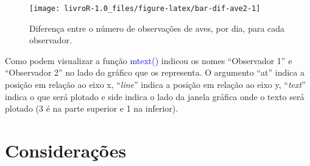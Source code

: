 \documentclass[14pt,titlepage, oneside, openany, a4paper]{book}
\newenvironment{Shaded}{\begin{snugshade}}{\end{snugshade}}
\newcommand{\DataTypeTok}[1]{\textcolor[rgb]{0.13,0.29,0.53}{#1}}
\newcommand{\DecValTok}[1]{\textcolor[rgb]{0.00,0.00,0.81}{#1}}
\newcommand{\FloatTok}[1]{\textcolor[rgb]{0.00,0.00,0.81}{#1}}
\newcommand{\KeywordTok}[1]{\textcolor[rgb]{0.13,0.29,0.53}{\textbf{#1}}}
\newcommand{\NormalTok}[1]{#1}
\newcommand{\OperatorTok}[1]{\textcolor[rgb]{0.81,0.36,0.00}{\textbf{#1}}}
\newcommand{\StringTok}[1]{\textcolor[rgb]{0.31,0.60,0.02}{#1}}
\begin{document}
\begin{Shaded}
\end{Shaded}

\begin{figure}[H]

{\centering \texttt{[image: livroR-1.0\_files/figure-latex/bar-dif-ave2-1]} 

}

\caption{Diferença entre o número de observações de aves, por dia, para cada observador.}\label{fig:bar-dif-ave2}
\end{figure}

Como podem visualizar a função \textcolor{blue}{mtext()} indicou os nomes ``Observador 1'' e ``Observador 2'' no lado do gráfico que os representa. O argumento ``at'' indica a posição em relação ao eixo x, ``\emph{line}'' indica a posição em relação ao eixo y, ``\emph{text}'' indica o que será plotado e side indica o lado da janela gráfica onde o texto será plotado (3 é na parte superior e 1 na inferior).

\hypertarget{considerauxe7uxf5es-2}{%
\section{Considerações}\label{considerauxe7uxf5es-2}}
\end{document}
